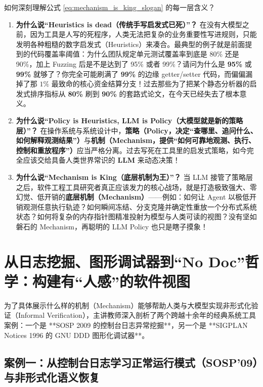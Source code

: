 \documentclass[a4paper]{article}
\begin{document}
如何深刻理解公式 \eqref{eq:mechanism_is_king_slogan} 的每一层含义？
\begin{enumerate}
    \item \textbf{为什么说“Heuristics is dead（传统手写启发式已死）”？}
    在没有大模型之前，因为工具是人写的死程序，人类无法把复杂的业务重要性写进规则，只能发明各种粗糙的数字启发式（Heuristics）来凑合。最典型的例子就是前面提到的代码覆盖率阈值：为什么团队规定单元测试覆盖率到底是 80\% 还是 90\%，加上 Fuzzing 后是不是达到了 95\% 或者 99\%？请问为什么是 \textbf{95\%} 或 \textbf{99\%} 就够了？你完全可能刷满了 \textbf{99\%} 的边缘 getter/setter 代码，而偏偏漏掉了那 $1\%$ 最致命的核心资金结算分支！过去那些为了把某个静态分析器的启发式排序指标从 \textbf{80\%} 刷到 \textbf{90\%} 的套路式论文，在今天已经失去了根本意义。
    \item \textbf{为什么说“Policy is Heuristics, LLM is Policy（大模型就是新的策略层）”？}
    在操作系统与系统设计中，\textbf{策略（Policy，决定“查哪里、追问什么、如何解释观测结果”）}与\textbf{机制（Mechanism，提供“如何可靠地观测、执行、控制和重放程序”）}应当严格分离。过去写死在工具里的启发式策略，如今完全应该交给具备人类世界常识的 \textbf{LLM} 来动态决策！
    \item \textbf{为什么说“Mechanism is King（底层机制为王）”？}
    当 LLM 接管了策略层之后，软件工程工具研究者真正应该发力的核心战场，就是打造极致强大、零幻觉、低开销的\textbf{底层机制（Mechanism）}——例如：如何让 Agent 以极低开销观测任意执行轨迹？如何瞬间冻结、分支克隆并确定性重放一个分布式系统状态？如何将复杂的内存指针图精准投射为模型与人类可读的视图？没有坚如磐石的 Mechanism，再聪明的 LLM Policy 也只是瞎子摸象！
\end{enumerate}

\section{从日志挖掘、图形调试器到“No Doc”哲学：构建有“人感”的软件视图}

为了具体展示什么样的机制（Mechanism）能够帮助人类与大模型实现非形式化验证（Informal Verification），主讲教师深入剖析了两个跨越十余年的经典系统工具案例：一个是 **SOSP 2009 的控制台日志异常挖掘**，另一个是 **SIGPLAN Notices 1996 的 GNU DDD 图形化调试器**。

\subsection{案例一：从控制台日志学习正常运行模式（SOSP'09）与非形式化语义恢复}
\end{document}
